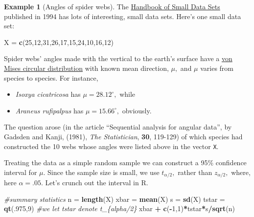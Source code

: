 \documentclass[
]{book}
\newenvironment{Shaded}{\begin{snugshade}}{\end{snugshade}}
\newcommand{\CommentTok}[1]{\textcolor[rgb]{0.56,0.35,0.01}{\textit{#1}}}
\newcommand{\DecValTok}[1]{\textcolor[rgb]{0.00,0.00,0.81}{#1}}
\newcommand{\FunctionTok}[1]{\textcolor[rgb]{0.13,0.29,0.53}{\textbf{#1}}}
\newcommand{\NormalTok}[1]{#1}
\newcommand{\OtherTok}[1]{\textcolor[rgb]{0.56,0.35,0.01}{#1}}
\newcommand{\SpecialCharTok}[1]{\textcolor[rgb]{0.81,0.36,0.00}{\textbf{#1}}}
\providecommand{\tightlist}{%
  \setlength{\itemsep}{0pt}\setlength{\parskip}{0pt}}
\theoremstyle{definition}
\theoremstyle{definition}
\newtheorem{example}{Example}[chapter]
\theoremstyle{definition}
\theoremstyle{definition}
\theoremstyle{remark}
\begin{document}
\begin{example}[Angles of spider webs]
The \href{https://www.google.com/books/edition/A_Handbook_of_Small_Data_Sets/vWu-MJM_obsC?hl=en}{Handbook of Small Data Sets} published in 1994 has lots of interesting, small data sets. Here's one small data set:

\begin{Shaded}
\begin{Highlighting}[]
\NormalTok{X }\OtherTok{=} \FunctionTok{c}\NormalTok{(}\DecValTok{25}\NormalTok{,}\DecValTok{12}\NormalTok{,}\DecValTok{31}\NormalTok{,}\DecValTok{26}\NormalTok{,}\DecValTok{17}\NormalTok{,}\DecValTok{15}\NormalTok{,}\DecValTok{24}\NormalTok{,}\DecValTok{10}\NormalTok{,}\DecValTok{16}\NormalTok{,}\DecValTok{12}\NormalTok{)}
\end{Highlighting}
\end{Shaded}

Spider webs' angles made with the vertical to the earth's surface have a \href{https://en.wikipedia.org/wiki/Von_Mises_distribution}{von Mises circular distribution} with known mean direction, \(\mu,\) and \(\mu\) varies from species to species. For instance,

\begin{itemize}
\tightlist
\item
  \emph{Isoxya cicatricosa} has \(\mu = 28.12^\circ,\) while
\item
  \emph{Araneus rufipalpus} has \(\mu = 15.66^\circ,\) obviously.
\end{itemize}

The question arose (in the article ``Sequential analysis for angular data'', by Gadsden and Kanji, (1981), \emph{The Statistician}, \textbf{30}, 119-129) of which species had constructed the 10 webs whose angles were listed above in the vector \texttt{X}.

Treating the data as a simple random sample we can construct a 95\% confidence interval for \(\mu\). Since the sample size is small, we use \(t_{\alpha/2},\) rather than \(z_{\alpha/2},\) where, here \(\alpha = .05\). Let's crunch out the interval in R.

\begin{Shaded}
\begin{Highlighting}[]
\CommentTok{\#summary statistics}
\NormalTok{n }\OtherTok{=} \FunctionTok{length}\NormalTok{(X)}
\NormalTok{xbar }\OtherTok{=} \FunctionTok{mean}\NormalTok{(X)}
\NormalTok{s }\OtherTok{=} \FunctionTok{sd}\NormalTok{(X)}
\NormalTok{tstar }\OtherTok{=} \FunctionTok{qt}\NormalTok{(.}\DecValTok{975}\NormalTok{,}\DecValTok{9}\NormalTok{) }\CommentTok{\#we let tstar denote t\_\{alpha/2\}}
\NormalTok{xbar }\SpecialCharTok{+} \FunctionTok{c}\NormalTok{(}\SpecialCharTok{{-}}\DecValTok{1}\NormalTok{,}\DecValTok{1}\NormalTok{)}\SpecialCharTok{*}\NormalTok{tstar}\SpecialCharTok{*}\NormalTok{s}\SpecialCharTok{/}\FunctionTok{sqrt}\NormalTok{(n)}
\end{Highlighting}
\end{Shaded}


\end{example}
\end{document}
